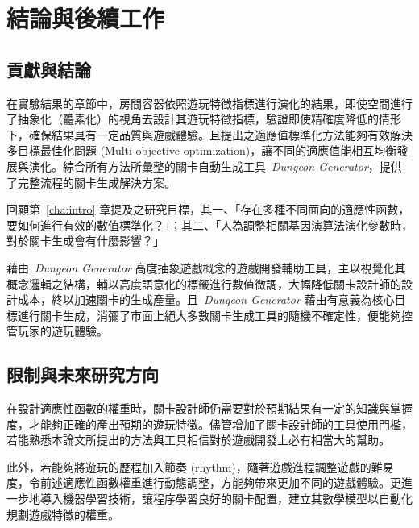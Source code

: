 \chapter{結論與後續工作}
\label{cha:conclusions}

\section{貢獻與結論}

在實驗結果的章節中，房間容器依照遊玩特徵指標進行演化的結果，即使空間進行了抽象化（體素化）的視角去設計其遊玩特徵指標，驗證即使精確度降低的情形下，確保結果具有一定品質與遊戲體驗。且提出之適應值標準化方法能夠有效解決多目標最佳化問題 (Multi-objective optimization)，讓不同的適應值能相互均衡發展與演化。綜合所有方法所彙整的關卡自動生成工具~\textit{Dungeon Generator}，提供了完整流程的關卡生成解決方案。

回顧第~\ref{cha:intro} 章提及之研究目標，其一、「存在多種不同面向的適應性函數，要如何進行有效的數值標準化？」；其二、「人為調整相關基因演算法演化參數時，對於關卡生成會有什麼影響？」

藉由~\textit{Dungeon Generator} 高度抽象遊戲概念的遊戲開發輔助工具，主以視覺化其概念邏輯之結構，輔以高度語意化的標籤進行數值微調，大幅降低關卡設計師的設計成本，終以加速關卡的生成產量。且~\textit{Dungeon Generator} 藉由有意義為核心目標進行關卡生成，消彌了市面上絕大多數關卡生成工具的隨機不確定性，便能夠控管玩家的遊玩體驗。

\section{限制與未來研究方向} 

在設計適應性函數的權重時，關卡設計師仍需要對於預期結果有一定的知識與掌握度，才能夠正確的產出預期的遊玩特徵。儘管增加了關卡設計師的工具使用門檻，若能熟悉本論文所提出的方法與工具相信對於遊戲開發上必有相當大的幫助。

此外，若能夠將遊玩的歷程加入節奏 (rhythm)，隨著遊戲進程調整遊戲的難易度，令前述適應性函數權重進行動態調整，方能夠帶來更加不同的遊戲體驗。更進一步地導入機器學習技術，讓程序學習良好的關卡配置，建立其數學模型以自動化規劃遊戲特徵的權重。